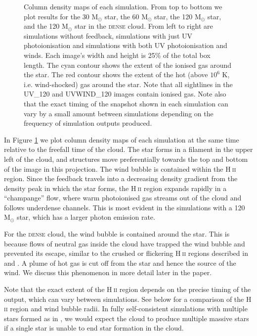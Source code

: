 \documentclass[a4paper,fleqn,usenatbib]{mnras}
\newcommand{\Msolar}{M$_{\odot}$\xspace}
\newcommand{\HII}{H$~$\textsc{ii}\xspace}
\begin{document}
\begin{figure}
	\caption{Column density maps of each simulation. From top to bottom we plot results for the 30 \Msolar star, the 60 \Msolar star, the 120 \Msolar star, and the 120 \Msolar star in the \textsc{dense} cloud. From left to right are simulations without feedback, simulations with just UV photoionisation and simulations with both UV photoionisation and winds. Each image's width and height is 25\% of the total box length. The cyan contour shows the extent of the ionised gas around the star. The red contour shows the extent of the hot (above $10^6$ K, i.e. wind-shocked) gas around the star. Note that all sightlines in the UV\_120 and UVWIND\_120 images contain ionised gas. Note also that the exact timing of the snapshot shown in each simulation can vary by a small amount between simulations depending on the frequency of simulation outputs produced.}
	\label{fig:columndensity}
\end{figure}

In Figure \ref{fig:columndensity} we plot column density maps of each simulation at the same time relative to the freefall time of the cloud. The star forms in a filament in the upper left of the cloud, and structures move preferentially towards the top and bottom of the image in this projection. The wind bubble is contained within the \HII region. Since the feedback travels into a decreasing density gradient from the density peak in which the star forms, the \HII region expands rapidly in a ``champange'' flow, where warm photoionised gas streams out of the cloud and follows underdense channels. This is most evident in the simulations with a 120 \Msolar star, which has a larger photon emission rate.

For the \textsc{dense} cloud, the wind bubble is contained around the star. This is because flows of neutral gas inside the cloud have trapped the wind bubble and prevented its escape, similar to the crushed or flickering \HII regions described in \cite{Peters2010} and \cite{Geen2015b}. A plume of hot gas is cut off from the star and hence the source of the wind. We discuss this phenomenon in more detail later in the paper.

Note that the exact extent of the \HII region depends on the precise timing of the output, which can vary between simulations. See below for a comparison of the \HII region and wind bubble radii. In fully self-consistent simulations with multiple stars formed as in \cite{Geen2018}, we would expect the cloud to produce multiple massive stars if a single star is unable to end star formation in the cloud.
\end{document}
